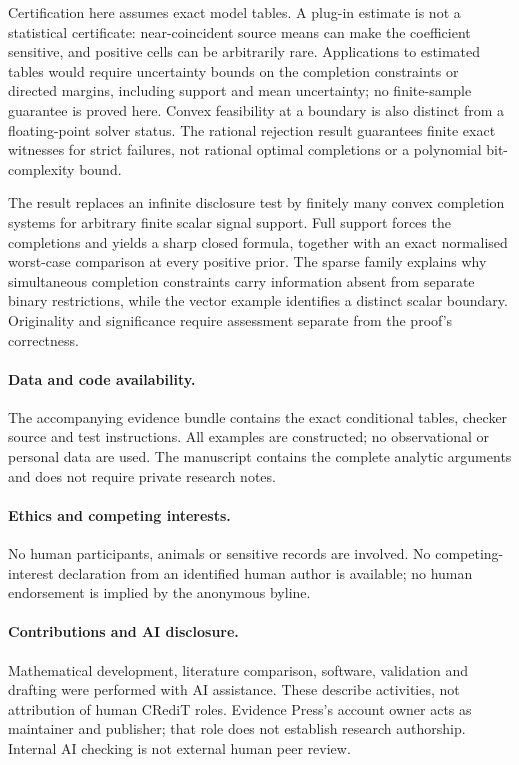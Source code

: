 \documentclass[11pt,a4paper]{article}
\begin{document}
Certification here assumes exact model tables. A plug-in estimate is not a statistical certificate: near-coincident source means can make the coefficient sensitive, and positive cells can be arbitrarily rare. Applications to estimated tables would require uncertainty bounds on the completion constraints or directed margins, including support and mean uncertainty; no finite-sample guarantee is proved here. Convex feasibility at a boundary is also distinct from a floating-point solver status. The rational rejection result guarantees finite exact witnesses for strict failures, not rational optimal completions or a polynomial bit-complexity bound.

The result replaces an infinite disclosure test by finitely many convex completion systems for arbitrary finite scalar signal support. Full support forces the completions and yields a sharp closed formula, together with an exact normalised worst-case comparison at every positive prior. The sparse family explains why simultaneous completion constraints carry information absent from separate binary restrictions, while the vector example identifies a distinct scalar boundary. Originality and significance require assessment separate from the proof's correctness.

\paragraph{Data and code availability.} The accompanying evidence bundle contains the exact conditional tables, checker source and test instructions. All examples are constructed; no observational or personal data are used. The manuscript contains the complete analytic arguments and does not require private research notes.
\paragraph{Ethics and competing interests.} No human participants, animals or sensitive records are involved. No competing-interest declaration from an identified human author is available; no human endorsement is implied by the anonymous byline.
\paragraph{Contributions and AI disclosure.} Mathematical development, literature comparison, software, validation and drafting were performed with AI assistance. These describe activities, not attribution of human CRediT roles. Evidence Press's account owner acts as maintainer and publisher; that role does not establish research authorship. Internal AI checking is not external human peer review.
\end{document}
